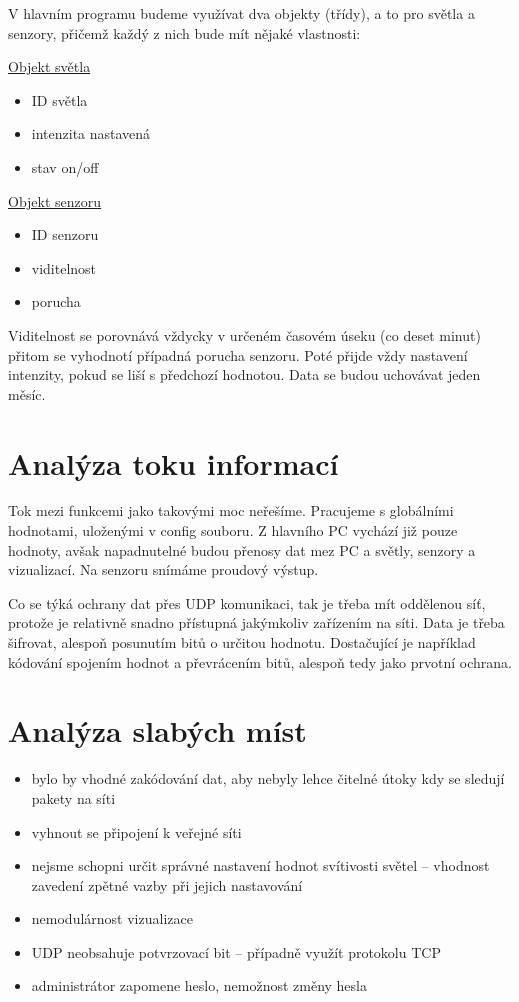 V hlavním programu budeme využívat dva objekty (třídy), a to pro světla a senzory, přičemž každý z nich bude mít nějaké vlastnosti:

\underline{Objekt světla}
\begin{itemize}
    \item ID světla
    \item intenzita nastavená
    \item stav on/off
\end{itemize}

\underline{Objekt senzoru}
\begin{itemize}
    \item ID senzoru
    \item viditelnost
    \item porucha
\end{itemize}

Viditelnost se porovnává vždycky v určeném časovém úseku (co deset minut) přitom se vyhodnotí případná porucha senzoru. Poté přijde vždy nastavení intenzity, pokud se liší s předchozí hodnotou. Data se budou uchovávat jeden měsíc.

\section{Analýza toku informací}

Tok mezi funkcemi jako takovými moc neřešíme. Pracujeme s globálními hodnotami, uloženými v config souboru. Z hlavního PC vychází již pouze hodnoty, avšak napadnutelné budou přenosy dat mez PC a světly, senzory a vizualizací. Na senzoru snímáme proudový výstup. 

Co se týká ochrany dat přes UDP komunikaci, tak je třeba mít oddělenou síť, protože je relativně snadno přístupná jakýmkoliv zařízením na síti. Data je třeba šifrovat, alespoň posunutím bitů o určitou hodnotu. Dostačující je například kódování spojením hodnot a převrácením bitů, alespoň tedy jako prvotní ochrana.


\section{Analýza slabých míst}

\begin{itemize}
    \item bylo by vhodné zakódování dat, aby nebyly lehce čitelné útoky kdy se sledují pakety na síti
    \item vyhnout se připojení k veřejné síti
    \item nejsme schopni určit správné nastavení hodnot svítivosti světel -- vhodnost zavedení zpětné vazby při jejich nastavování 
    \item nemodulárnost vizualizace
    \item UDP neobsahuje potvrzovací bit -- případně využít protokolu TCP
    \item administrátor zapomene heslo, nemožnost změny hesla
\end{itemize}


\endinput
